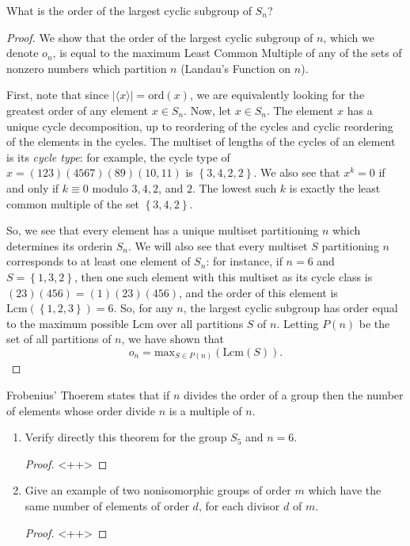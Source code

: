 \documentclass[12pt]{article}
\theoremstyle{definition}
\newenvironment{problem}[2][Problem]{\begin{trivlist}
\item[\hskip \labelsep {\bfseries #1}\hskip \labelsep {\bfseries #2.}]}{\end{trivlist}}
\begin{document}
\begin{problem}{2}
	What is the order of the largest cyclic subgroup of $S_n$?
	\begin{proof}
		We show that the order of the largest cyclic subgroup of $n$, which we denote $o_n$, is equal to the maximum Least Common Multiple of any of the sets of nonzero numbers which partition $n$ (Landau's Function on $n$).
		\par First, note that since $\left \lvert {  \langle x\rangle } \right \lvert  = \text{ord}(x)$, we are equivalently looking for the greatest order of any element $x \in S_n$. Now, let $x \in S_n$. The element $x$ has a unique cycle decomposition, up to reordering of the cycles and cyclic reordering of the elements in the cycles. The multiset of lengths of the cycles of an element is its \textit{cycle type}: for example, the cycle type of $x = (123)(4567)(89)(10,11)$ is $\left\{ 3,4,2,2 \right\}$. We also see that $x^k = 0$ if and only if $k \equiv 0$ modulo $3,4,2$, and $2$. The lowest such $k$ is exactly the least common multiple of the set $\left\{ 3,4,2 \right\}$.
		\par So, we see that every element has a unique multiset partitioning $n$ which determines its orderin $S_n$. We will also see that every multiset $S$ partitioning $n$ corresponds to at least one element of $S_n$: for instance, if $n=6$ and $S = \left\{ 1,3,2 \right\}$, then one such element with this multiset as its cycle class is $(23)(456) = (1)(23)(456)$, and the order of this element is $\text{Lcm}(\left\{ 1,2,3 \right\}) = 6$.
		So, for any $n$, the largest cyclic subgroup has order equal to the maximum possible $\text{Lcm}$ over all partitions $S$ of $n$. Letting $P(n)$ be the set of all partitions of $n$, we have shown that
		\[o_n = \text{max}_{S \in P(n)} (\text{Lcm}(S)).\]
	\end{proof}
\end{problem}
\begin{problem}{3}
	Frobenius' Thoerem states that if $n$ divides the order of a group then the number of elements whose order divide $n$ is a multiple of $n$.
	\begin{enumerate}[label = (\alph*)]
		\item Verify directly this theorem for the group $S_5$ and $n = 6$.
			\begin{proof}
				<++>
			\end{proof}
		\item Give an example of two nonisomorphic groups of order $m$ which have the same number of elements of order $d$, for each divisor $d$ of $m$.
			\begin{proof}
				<++>
			\end{proof}
	\end{enumerate}
\end{problem}
\end{document}
